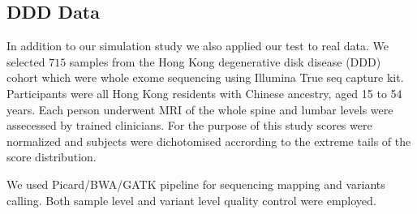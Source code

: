 \subsection{DDD Data}
\label{sub:ddd_data}

In addition to our simulation study we also applied our test to real data.
We selected $715$ samples from the Hong Kong degenerative disk disease (DDD) cohort which were whole exome sequencing using Illumina True seq capture kit.
Participants were all Hong Kong residents with Chinese ancestry, aged 15 to 54 years.
Each person underwent MRI of the whole spine and lumbar levels were assecessed by trained clinicians\cite{Li2016}.
For the purpose of this study scores were normalized and subjects were dichotomised accrording to the extreme tails of the score distribution. 

We used Picard/BWA/GATK pipeline for sequencing mapping and variants calling.
Both sample level and variant level quality control were employed\cite{Purcell2014}.
